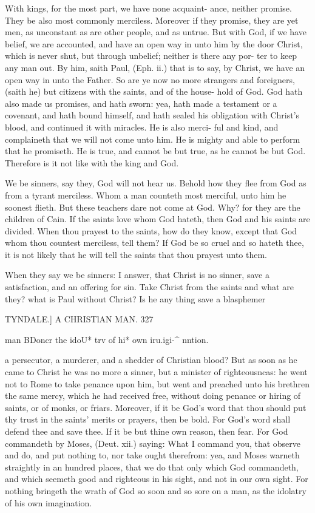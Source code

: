 \documentclass{custom}
\begin{document}
{With kings, for the most part, we have none acquaint- 
ance, neither promise. They be also most commonly 
merciless. Moreover if they promise, they are yet men, 
as unconstant as are other people, and as untrue. But 
with God, if we have belief, we are accounted, and have 
an open way in unto him by the door Christ, which is 
never shut, but through unbelief; neither is there any por-
ter to keep any man out. By him, saith Paul, (Eph. ii.)
that is to say, by Christ, we have an open way in unto the 
Father. So are ye now no more strangers and foreigners,
(saith he) but citizens with the saints, and of the house- 
hold of God. God hath also made us promises, and hath 
sworn: yea, hath made a testament or a covenant, and hath 
bound himself, and hath sealed his obligation with Christ's 
blood, and continued it with miracles. He is also merci- 
ful and kind, and complaineth that we will not come unto 
him. He is mighty and able to perform that he promiseth.
He is true, and cannot be but true, as he cannot be but
God. Therefore is it not like with the king and God. 

We be sinners, say they, God will not hear us. Behold 
how they flee from God as from a tyrant merciless. Whom 
a man counteth most merciful, unto him he soonest flieth. 
But these teachers dare not come at God. Why? for 
they are the children of Cain. If the saints love whom 
God hateth, then God and his saints are divided. When 
thou prayest to the saints, how do they know, except that
God whom thou countest merciless, tell them? If God be
so cruel and so hateth thee, it is not likely that he will tell
the saints that thou prayest unto them. 

When they say we be sinners: I answer, that Christ is 
no sinner, save a satisfaction, and an offering for sin. 
Take Christ from the saints and what are they? what is 
Paul without Christ? Is he any thing save a blasphemer 


TYNDALE.]
A CHRISTlAN MAN.
327

man BDoncr 
the idoU* 
trv of hi* 
own iru.igi-^ 
nntion. 

a persecutor, a murderer, and a shedder of Christian blood? 
But as soon as he came to Christ he was no more a sinner, 
but a minister of righteousncas: he went not to Rome to 
take penance upon him, but went and preached unto his 
brethren the same mercy, which he had received free, 
without doing penance or hiring of saints, or of monks, or 
friars. Moreover, if it be God's word that thou should 
put thy trust in the saints' merits or prayers, then be bold. 
For God's word shall defend thee and save thee. If it be 
but thine own reason, then fear. For God commandeth 
by Moses, (Deut. xii.) saying: What I command you, 
that observe and do, and put nothing to, nor take ought 
therefrom: yea, and Moses warneth straightly in an hundred 
places, that we do that only which God commandeth, and 
which seemeth good and righteous in his sight, and not in
our own sight. For nothing bringeth the wrath of God 
so soon and so sore on a man, as the idolatry of his own 
imagination. 

}
\end{document}
